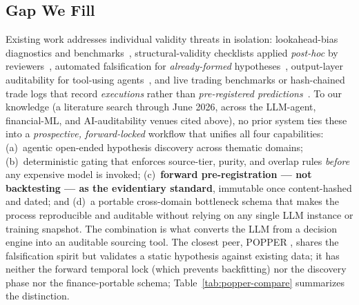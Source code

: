 \documentclass[11pt]{article}
\begin{document}
\subsection*{Gap We Fill}

Existing work addresses individual validity threats in isolation: lookahead-bias
diagnostics and benchmarks~\citep{gao2025lookaheadbias,benhenda2026lookaheadbench},
structural-validity checklists applied \emph{post-hoc} by
reviewers~\citep{kong2026evaluating}, automated falsification for
\emph{already-formed} hypotheses~\citep{huang2025popper}, output-layer
auditability for tool-using agents~\citep{khatchadourian2026replayable}, and
live trading benchmarks or hash-chained trade logs that record
\emph{executions} rather than \emph{pre-registered
predictions}~\citep{qian2025whenagents,chen2025stockbench,45ck2025llmquant}.
To our knowledge (a literature search through June 2026, across the LLM-agent, financial-ML, and
AI-auditability venues cited above), no prior system ties these into a \emph{prospective,
forward-locked} workflow that unifies all four capabilities: (a)~agentic
open-ended hypothesis discovery across thematic domains; (b)~deterministic
gating that enforces source-tier, purity, and overlap rules \emph{before} any
expensive model is invoked; (c)~\textbf{forward pre-registration --- not
backtesting --- as the evidentiary standard}, immutable once content-hashed and
dated; and (d)~a portable cross-domain bottleneck schema that makes the process
reproducible and auditable without relying on any single LLM instance or
training snapshot. The combination is what converts the LLM from a decision
engine into an auditable sourcing tool. The closest peer, POPPER
\citep{huang2025popper}, shares the falsification spirit but validates a static
hypothesis against existing data; it has neither the forward temporal lock
(which prevents backfitting) nor the discovery phase nor the
finance-portable schema; Table~\ref{tab:popper-compare} summarizes the distinction.
\end{document}
